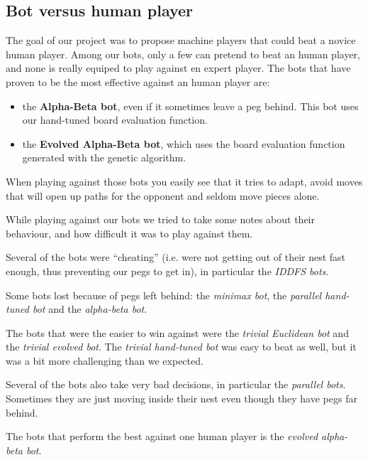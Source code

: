 \subsection{Bot versus human player}
The goal of our project was to propose machine players that could beat a
novice human player. Among our bots, only a few can pretend to beat an human
player, and none is really equiped to play against en expert player. The bots
that have proven to be the most effective against an human player are:

\begin{itemize}
  \item the \textbf{Alpha-Beta bot}, even if it sometimes leave a peg behind.
        This bot uses our hand-tuned board evaluation function.
  \item the \textbf{Evolved Alpha-Beta bot}, which uses the board evaluation
        function generated with the genetic algorithm.
\end{itemize}

When playing against those bots you easily see that it tries to adapt, avoid
moves that will open up paths for the opponent and seldom move pieces alone.

While playing against our bots we tried to take some notes about their
behaviour, and how difficult it was to play against them.

Several of the bots were ``cheating'' (i.e. were not getting out of their
nest fast enough, thus preventing our pegs to get in), in particular the
\textit{IDDFS bots}.

Some bots lost because of pegs left behind: the \textit{minimax bot}, the
\textit{parallel hand-tuned bot} and the \textit{alpha-beta bot}.

The bots that were the easier to win against were the \textit{trivial Euclidean bot} and
the \textit{trivial evolved bot}. The \textit{trivial hand-tuned bot} was easy
to beat as well, but it was a bit more challenging than we expected.

Several of the bots also take very bad decisions, in particular the
\textit{parallel bots}. Sometimes they are just moving inside their
nest even though they have pegs far behind.

The bots that perform the best against one human player is the
\textit{evolved alpha-beta bot}.

